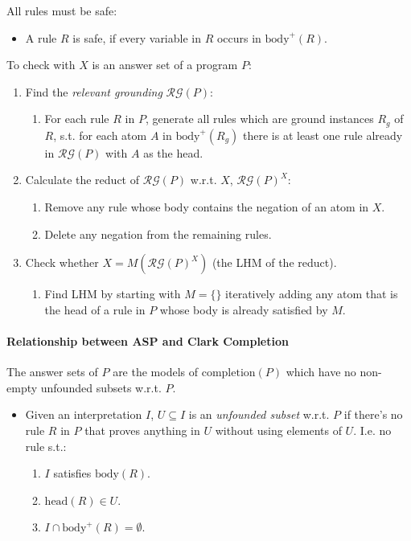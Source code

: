 \documentclass[twocolumn,english]{article}
\begin{document}
All rules must be safe:
\begin{itemize}
\item A rule $R$ is safe, if every variable in $R$ occurs in $\text{body}^{+}\left(R\right)$.
\end{itemize}
To check with $X$ is an answer set of a program $P$:
\begin{enumerate}
\item Find the \emph{relevant grounding} $\mathcal{RG}\left(P\right)$:
\begin{enumerate}
\item For each rule $R$ in $P$, generate all rules which are ground instances
$R_{g}$ of $R$, s.t. for each atom $A$ in $\text{body}^{+}\left(R_{g}\right)$
there is at least one rule already in $\mathcal{RG}\left(P\right)$
with $A$ as the head.
\end{enumerate}
\item Calculate the reduct of $\mathcal{RG}\left(P\right)$ w.r.t. $X$,
$\mathcal{RG}\left(P\right)^{X}$:
\begin{enumerate}
\item Remove any rule whose body contains the negation of an atom in $X$.
\item Delete any negation from the remaining rules.
\end{enumerate}
\item Check whether $X=M\left(\mathcal{RG}\left(P\right)^{X}\right)$ (the
LHM of the reduct).
\begin{enumerate}
\item Find LHM by starting with $M=\{\}$ iteratively adding any atom that
is the head of a rule in $P$ whose body is already satisfied by $M$.
\end{enumerate}
\end{enumerate}

\paragraph{Relationship between ASP and Clark Completion}

The answer sets of $P$ are the models of $\text{completion}$$\left(P\right)$
which have no non-empty unfounded subsets w.r.t. $P$.
\begin{itemize}
\item Given an interpretation $I$, $U\subseteq I$ is an \emph{unfounded
subset} w.r.t. $P$ if there's no rule $R$ in $P$ that proves anything
in $U$ without using elements of $U$. I.e. no rule s.t.:
\begin{enumerate}
\item $I$ satisfies $\text{body}\left(R\right)$.
\item $\text{head}\left(R\right)\in U$.
\item $I\cap\text{body}^{+}\left(R\right)=\emptyset$.
\end{enumerate}
\end{itemize}
\end{document}
